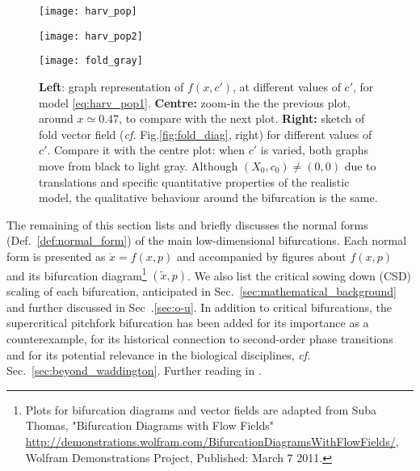 \begin{figure}[h]
	\centering
	\begin{minipage}[c]{0.32\textwidth}
		\texttt{[image: harv\_pop]}
		\renewcommand{\figurename}{Fig.}
	\end{minipage}
	\begin{minipage}[c]{0.32\textwidth}
		\texttt{[image: harv\_pop2]}
		\renewcommand{\figurename}{Fig.}
	\end{minipage}
	\hspace{0.05cm}
	\begin{minipage}[c]{0.32\textwidth}
		\texttt{[image: fold\_gray]}
		\renewcommand{\figurename}{Fig.}
	\end{minipage} 
	
	\caption{\small \textbf{Left}: graph representation of $f(x,c')$, at different values of $c'$, for model \ref{eq:harv_pop1}. \textbf{Centre:} zoom-in the the previous plot, around $x \simeq 0.47$, to compare with the next plot. \textbf{Right:} sketch of fold vector field (\textit{cf.} Fig.\ref{fig:fold_diag}, right) for different values of $c'$. Compare it with the centre plot: when $c'$ is varied, both graphs move from black to light gray. Although $(X_0,c_0) \neq (0,0)$ due to translations and specific quantitative properties of the realistic model, the qualitative behaviour around the bifurcation is the same.}
	\label{fig:local_quadratic}
\end{figure}



The remaining of this section lists and briefly discusses the normal forms (Def.~\ref{def:normal_form}) of the main low-dimensional bifurcations. Each normal form is presented as $\dot{x} = f(x,p)$ and accompanied by figures about $ f(x,p)$ and its bifurcation diagram\footnote{Plots for bifurcation diagrams and vector fields are adapted from Suba Thomas, "Bifurcation Diagrams with Flow Fields" \url{http://demonstrations.wolfram.com/BifurcationDiagramsWithFlowFields/}, Wolfram Demonstrations Project, Published: March 7 2011.} $(\tilde{x}, p)$. We also list the critical sowing down (\gls{CSD}) scaling of each bifurcation,  anticipated in Sec.~\ref{sec:mathematical_background} and further discussed in Sec~.\ref{sec:o-u}. In addition to critical bifurcations, the supercritical pitchfork bifurcation has been added for its importance as a counterexample, for its historical connection to second-order phase transitions and for its potential relevance in the biological disciplines, \textit{cf.} Sec.~\ref{sec:beyond_waddington}. Further reading in \textcite{kuznetsov2013elements,strogatz2018nonlinear}. \\


